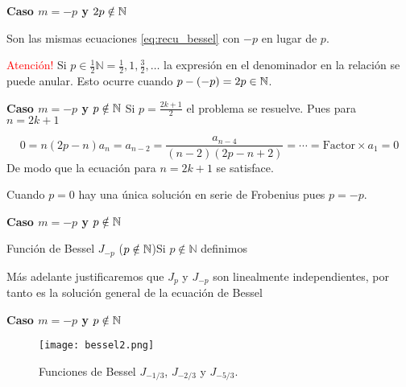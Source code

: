 \begin{frame}[fragile]{\textbf{Caso $m=-p$ y $2p\notin\mathbb{N}$}}


Son las mismas ecuaciones \eqref{eq:recu_bessel} con $-p$ en lugar de $p$. 




\textcolor{red}{Atención!} Si $p\in\frac12\mathbb{N}=\frac12,1,\frac32,\ldots$  la expresión en el denominador en la relación
se puede anular.  Esto ocurre cuando  $p-(-p)=2p\in\mathbb{N}$.
\end{frame}



\begin{frame}[fragile]{\textbf{Caso $m=-p$ y $p\notin\mathbb{N}$}}
Si $p=\frac{2k+1}{2}$ el problema se resuelve. Pues para $n=2k+1$

\[0=n(2p-n)a_n=a_{n-2}= \frac{a_{n-4}}{(n-2)(2p-n+2)}=\cdots=
 \text{Factor}\times a_1=0
\]
  De modo que la ecuación para $n=2k+1$ se satisface.

Cuando $p=0$  hay una única solución en serie de Frobenius pues $p=-p$.

\end{frame}



\begin{frame}[fragile]{\textbf{Caso $m=-p$ y $p\notin\mathbb{N}$}}


\begin{block}{Función de Bessel $J_{-p}$ ($p\notin\mathbb{N}$)}Si $p\notin\mathbb{N}$ definimos
\end{block}

Más adelante justificaremos que $J_p$ y $J_{-p}$ son linealmente independientes, por tanto
es la solución general de la ecuación de Bessel


\end{frame}



\begin{frame}[fragile]{\textbf{Caso $m=-p$ y $p\notin\mathbb{N}$}}
\begin{figure}[h]
\begin{center}
\texttt{[image: bessel2.png]}
\end{center}
\caption{Funciones de Bessel $J_{-1/3}$, $J_{-2/3}$ y $J_{-5/3}$.}
\end{figure}

\end{frame}



